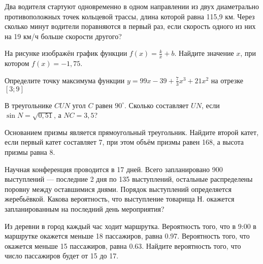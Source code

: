 \documentclass[twocolumn]{article}
\begin{document}
\begin{taskBN}{9}
Два водителя стартуют одновременно в одном направлении из двух диаметрально противоположных точек кольцевой трассы, длина которой равна 115,9 км. Через сколько минут водители поравняются в первый раз, если скорость одного из них на 19 км/ч больше скорости другого? 
\end{taskBN}

\begin{taskBN}{10}
На рисунке изображён график функции $f(x)=\frac{k}{x}+b$. Найдите значение $x$, при котором $f(x)=-1,75$.\vspace{2.5cm}
\end{taskBN}

\begin{taskBN}{11}
Определите точку максимума функции $y = 99x-39+\frac{7}{3}x^{3}+21x^{2}$ на отрезке $\left[3;9 \right]$
\end{taskBN}




\cleardoublepage
\def\examvart{Вариант 18.2}
\normalsize

\startpartone
\large




\begin{taskBN}{1}
В треугольнике $CUN$ угол $C$ равен $90^\circ$. Сколько составляет  $UN$, если $\sin{N}=\sqrt{0,51}$, а  $NC=3,5$? 
\end{taskBN}

\begin{taskBN}{2}
Основанием призмы является  прямоугольный треугольник. Найдите второй катет, если первый катет составляет 7, при этом объём призмы равен 168, а высота призмы равна 8. 
\end{taskBN}

\begin{taskBN}{3}
Научная конференция проводится в 17 дней. Всего запланировано 900 выступлений — последние 2 дня по 135 выступлений, остальные распределены поровну между оставшимися днями. Порядок выступлений определяется жеребьёвкой. Какова вероятность, что выступление товарища Н. окажется запланированным на последний день мероприятия?
\end{taskBN}

\begin{taskBN}{4}
Из деревни в город каждый час ходит маршрутка. Вероятность того, что в 9:00 в маршрутке окажется меньше 18 пассажиров, равна 0.97. Вероятность того, что окажется меньше 15 пассажиров, равна 0.63. Найдите вероятность того, что число пассажиров будет от 15 до 17.
\end{taskBN}
\end{document}
